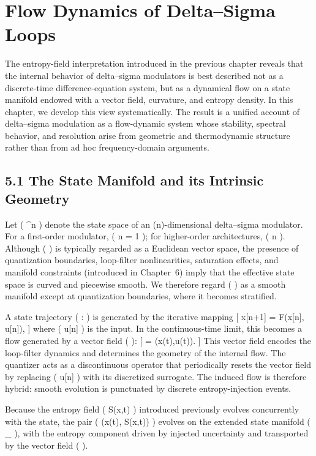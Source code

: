 \chapter{Flow Dynamics of Delta–Sigma Loops}

The entropy-field interpretation introduced in the previous chapter reveals that the internal behavior of delta–sigma modulators is best described not as a discrete-time difference-equation system, but as a dynamical flow on a state manifold endowed with a vector field, curvature, and entropy density. In this chapter, we develop this view systematically. The result is a unified account of delta–sigma modulation as a flow-dynamic system whose stability, spectral behavior, and resolution arise from geometric and thermodynamic structure rather than from ad hoc frequency-domain arguments.

\section*{5.1 The State Manifold and its Intrinsic Geometry}

Let (  \subset {}^n ) denote the state space of an (n)-dimensional delta–sigma modulator. For a first-order modulator, ( n = 1 ); for higher-order architectures, ( n  ). Although (  ) is typically regarded as a Euclidean vector space, the presence of quantization boundaries, loop-filter nonlinearities, saturation effects, and manifold constraints (introduced in Chapter~6) imply that the effective state space is curved and piecewise smooth. We therefore regard (  ) as a smooth manifold except at quantization boundaries, where it becomes stratified.

A state trajectory ( \gamma :  \rightarrow {} ) is generated by the iterative mapping
[
x[n+1] = F(x[n], u[n]),
]
where ( u[n] ) is the input. In the continuous-time limit, this becomes a flow generated by a vector field (  ):
[
 = (x(t),u(t)).
]
This vector field encodes the loop-filter dynamics and determines the geometry of the internal flow. The quantizer acts as a discontinuous operator that periodically resets the vector field by replacing ( u[n] ) with its discretized surrogate. The induced flow is therefore hybrid: smooth evolution is punctuated by discrete entropy-injection events.

Because the entropy field ( S(x,t) ) introduced previously evolves concurrently with the state, the pair ( (x(t), S(x,t)) ) evolves on the extended state manifold (  \times {}_{} ), with the entropy component driven by injected uncertainty and transported by the vector field (  ).


